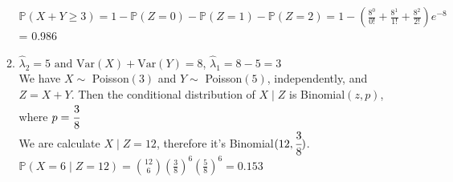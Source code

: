 \documentclass[12pt, oneside, a4paper]{article}
\begin{document}
\begin{enumerate}
\begin{enumerate}[label = (\alph*)]
			$\mathbb{P}(X+Y \geq 3) = 1 - \mathbb{P}(Z = 0) - \mathbb{P}(Z = 1) - \mathbb{P}(Z = 2) = 1 - (\frac{8^0}{0!} + \frac{8^1}{1!} + \frac{8^2}{2!})e^{-8}$ = 0.986
			\item %
			$\hat \lambda_2 = 5 \text{ and } \text{Var}(X) + \text{Var}(Y) = 8$, $\hat \lambda_1 = 8-5 = 3$\\
			We have $X \sim $ Poisson$(3)$ and $Y \sim $ Poisson$(5)$, independently, and $Z = X + Y$. Then the conditional distribution of $X \mid Z$ is Binomial$(z,p)$, where $p = \cfrac{3}{8}$ \\
			We are calculate $X\mid Z = 12$, therefore it's Binomial$(12, \cfrac{3}{8})$. \\
			$\mathbb{P}(X = 6 \mid Z = 12) = \binom{12}{6}(\frac{3}{8})^6 (\frac{5}{8})^6 = 0.153$
		\end{enumerate}
	\end{enumerate}
\end{document}
